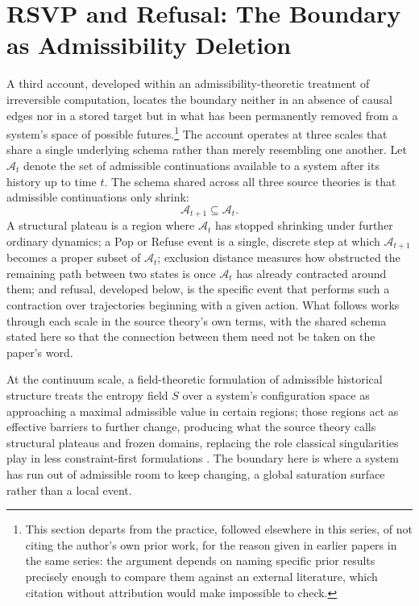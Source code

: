\documentclass[11pt]{article}
\theoremstyle{plain}
\begin{document}
\section{RSVP and Refusal: The Boundary as Admissibility Deletion}
\label{sec:rsvp}

A third account, developed within an admissibility-theoretic treatment of irreversible computation, locates the boundary neither in an absence of causal edges nor in a stored target but in what has been permanently removed from a system's space of possible futures.\footnote{This section departs from the practice, followed elsewhere in this series, of not citing the author's own prior work, for the reason given in earlier papers in the same series: the argument depends on naming specific prior results precisely enough to compare them against an external literature, which citation without attribution would make impossible to check.} The account operates at three scales that share a single underlying schema rather than merely resembling one another. Let $\mathcal{A}_t$ denote the set of admissible continuations available to a system after its history up to time $t$. The schema shared across all three source theories is that admissible continuations only shrink:
\[
\mathcal{A}_{t+1} \subseteq \mathcal{A}_t.
\]
A structural plateau is a region where $\mathcal{A}_t$ has stopped shrinking under further ordinary dynamics; a Pop or Refuse event is a single, discrete step at which $\mathcal{A}_{t+1}$ becomes a proper subset of $\mathcal{A}_t$; exclusion distance measures how obstructed the remaining path between two states is once $\mathcal{A}_t$ has already contracted around them; and refusal, developed below, is the specific event that performs such a contraction over trajectories beginning with a given action. What follows works through each scale in the source theory's own terms, with the shared schema stated here so that the connection between them need not be taken on the paper's word.

At the continuum scale, a field-theoretic formulation of admissible historical structure treats the entropy field $S$ over a system's configuration space as approaching a maximal admissible value in certain regions; those regions act as effective barriers to further change, producing what the source theory calls structural plateaus and frozen domains, replacing the role classical singularities play in less constraint-first formulations \citep{rsvptheory}. The boundary here is where a system has run out of admissible room to keep changing, a global saturation surface rather than a local event.
\end{document}
